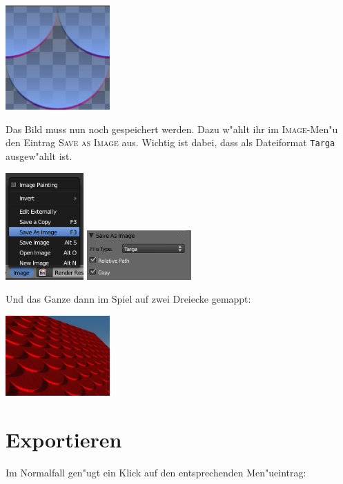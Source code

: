 \documentclass[a4paper]{article}
\newcommand{\ccaption}[1]{\textsc{#1}}
\newcommand{\cvalue}[1]{\texttt{#1}}
\begin{document}
\begin{center}
\includegraphics[width=40mm]{../images/blender/bumpmap.png}
\end{center}

Das Bild muss nun noch gespeichert werden. Dazu w"ahlt ihr im \ccaption{Image}-Men"u den Eintrag \ccaption{Save as Image} aus. Wichtig ist dabei,
dass als Dateiformat \cvalue{Targa} ausgew"ahlt ist.
\begin{center}
\includegraphics[width=30mm]{../images/blender/image-menu.png}
\includegraphics[width=40mm]{../images/blender/blender-image-saving.png}
\end{center}

Und das Ganze dann im Spiel auf zwei Dreiecke gemappt:
\begin{center}
\includegraphics[width=40mm]{../images/blender/bumpmap-ingame.png}
\end{center}

\section{Exportieren}
Im Normalfall gen"ugt ein Klick auf den entsprechenden Men"ueintrag:
\end{document}
